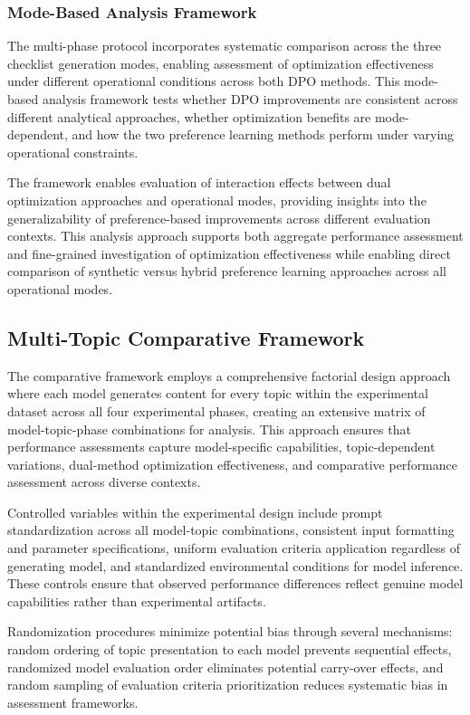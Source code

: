 \subsubsection{Mode-Based Analysis Framework}

The multi-phase protocol incorporates systematic comparison across the three checklist generation modes, enabling assessment of optimization effectiveness under different operational conditions across both DPO methods. This mode-based analysis framework tests whether DPO improvements are consistent across different analytical approaches, whether optimization benefits are mode-dependent, and how the two preference learning methods perform under varying operational constraints.

The framework enables evaluation of interaction effects between dual optimization approaches and operational modes, providing insights into the generalizability of preference-based improvements across different evaluation contexts. This analysis approach supports both aggregate performance assessment and fine-grained investigation of optimization effectiveness while enabling direct comparison of synthetic versus hybrid preference learning approaches across all operational modes.

\subsection{Multi-Topic Comparative Framework}

The comparative framework employs a comprehensive factorial design approach where each model generates content for every topic within the experimental dataset across all four experimental phases, creating an extensive matrix of model-topic-phase combinations for analysis. This approach ensures that performance assessments capture model-specific capabilities, topic-dependent variations, dual-method optimization effectiveness, and comparative performance assessment across diverse contexts.

Controlled variables within the experimental design include prompt standardization across all model-topic combinations, consistent input formatting and parameter specifications, uniform evaluation criteria application regardless of generating model, and standardized environmental conditions for model inference. These controls ensure that observed performance differences reflect genuine model capabilities rather than experimental artifacts.

Randomization procedures minimize potential bias through several mechanisms: random ordering of topic presentation to each model prevents sequential effects, randomized model evaluation order eliminates potential carry-over effects, and random sampling of evaluation criteria prioritization reduces systematic bias in assessment frameworks.

